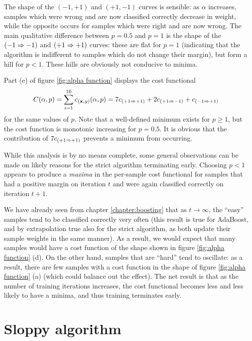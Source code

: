 The shape of the $(-1, +1)$ and $(+1, -1)$ curves is
sensible: as $\alpha$ increases, samples which were wrong and are now
classified correctly decrease in weight, while the opposite occurs for
samples which were right and are now wrong.  The main qualitative
difference between $p=0.5$ and $p=1$ is the shape of the $(-1 \Rightarrow -1)$
and $(+1 \Rightarrow +1)$ curves: these are flat for $p=1$ (indicating that
the algorithm is indifferent to samples which do not change their
margin), but form a hill for $p < 1$.  These hills are obviously not
conducive to minima.

Part (e) of figure \ref{fig:alpha function} displays the cost
functional 
%
\begin{equation}
C(\alpha,p) = \sum_{i=1}^{10} c_{(\mathbf{x}, y)}(\alpha, p) 
= 7c_{(+1 \Rightarrow +1)} + 2c_{(+1 \Rightarrow -1)} + c_{(-1 \Rightarrow +1)}
\end{equation}
%
for the same values of $p$.  Note that a well-defined minimum exists
for $p \geq 1$, but the cost function is monotonic increasing for $p =
0.5$.  It is obvious that the contribution of $7c_{(+1 \Rightarrow +1)}$
prevents a minimum from occurring.

While this analysis is by no means complete, some general observations
can be made on likely reasons for the strict algorithm terminating
early.  Choosing $p < 1$ appears to produce a \emph{maxima} in the
per-sample cost functional for samples that had a positive margin on
iteration $t$ and were again classified correctly on iteration $t+1$.

We have already seen from chapter \ref{chapter:boosting} that as $t
\rightarrow \infty$, the ``easy'' samples tend to be classified
correctly very often (this result is true for AdaBoost, and by
extrapolation true also for the strict algorithm, as both update their
sample weights in the same manner).  As a result, we would expect that
many samples would have a cost function of the shape shown in figure
\ref{fig:alpha function} (d).  On the other hand, samples that are
``hard'' tend to oscillate: as a result, there are few samples with a
cost function in the shape of figure \ref{fig:alpha function} (a)
(which could balance out the effect).  The net result is that as the
number of training iterations increases, the cost functional becomes
less and less likely to have a minima, and thus training terminates
early.

\section{Sloppy algorithm}

